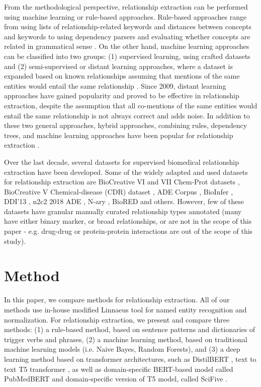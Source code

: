 \documentclass[final,12pt,3p,times,twocolumn,authoryear]{elsarticle}
\begin{document}
From the methodological perspective, relationship extraction can be performed using machine learning or rule-based approaches. Rule-based approaches range from using lists of relationship-related keywords and distances between concepts and keywords \citep{abacha2011automatic,ravikumar2017belminer} to using dependency parsers and evaluating whether concepts are related in grammatical sense \citep{erkan2007semi,goertzel2006using}. On the other hand, machine learning approaches can be classified into two groups: (1) supervised learning, using crafted datasets \citep{peng2018chemical,liu2017attention} and (2) semi-supervised or distant learning approaches, where a dataset is expanded based on known relationships assuming that mentions of the same entities would entail the same relationship \citep{mintz2009distant}. Since 2009, distant learning approaches have gained popularity and proved to be effective in relationship extraction, despite the assumption that all co-mentions of the same entities would entail the same relationship is not always correct and adds noise. In addition to these two general approaches, hybrid approaches, combining rules, dependency trees, and machine learning approaches have been popular for relationship extraction \citep{erkan2007semi,muzaffar2015relation}.

Over the last decade, several datasets for supervised biomedical relationship extraction have been developed.  Some of the widely adapted and used datasets for relationship extraction are BioCreative VI and VII Chem-Prot datasets \citep{miranda2021overview}, BioCreative V Chemical-disease (CDR) dataset \citep{li2016biocreative}, ADE Corpus \citep{gurulingappa2012development}, BioInfer \citep{pyysalo2007bioinfer}, DDI'13 \citep{herrero2013ddi}, n2c2 2018 ADE \citep{henry20202018}, N-ary \citep{peng2017cross}, BioRED \citep{luo2022biored} and others. However, few of these datasets have granular manually curated relationship types annotated (many have either binary marker, or broad relationships, or are not in the scope of this paper - e.g. drug-drug or protein-protein interactions are out of the scope of this study). 


\section{Method}

In this paper, we compare methods for relationship extraction. All of our methods use in-house modified Linnaeus  \citep{gerner2010linnaeus} tool for named entity recognition and normalization. For relationship extraction, we present and compare three methods: (1) a rule-based method, based on sentence patterns and dictionaries of trigger verbs and phrases,  (2) a machine learning method, based on traditional machine learning models (i.e. Naive Bayes, Random Forests), and (3) a deep learning method based on transformer architectures, such as DistilBERT \citep{sanh2019distilbert}, text to text T5 transformer \citep{raffel2020exploring}, as well as domain-specific BERT-based model called PubMedBERT \citep{gu2021domain} and domain-specific version of T5 model, called SciFive \citep{phan2021scifive}.
\end{document}
